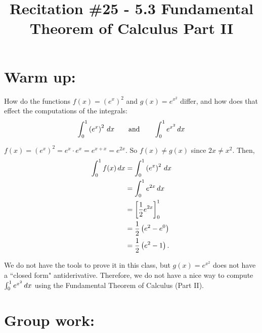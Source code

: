 \documentclass[handout,nooutcomes]{ximera}
\title{Recitation \#25 - 5.3 Fundamental Theorem of Calculus Part II}
\begin{document}
\begin{abstract}		\end{abstract}
\maketitle

\section*{Warm up:} 
How do the functions $f(x) = \left( e^x \right)^2$ and $g(x) = e^{x^2}$ differ, and how does that effect the computations of the integrals:
$$ \int_0^1 \left(e^x \right)^2 \,d x	\qquad	\text{and}	\qquad	\int_0^1 e^{x^2} \,d x $$
		\begin{freeResponse}
		$f(x) = \left( e^x \right)^2 = e^x \cdot e^x = e^{x+x} = e^{2x}$.  
		So $f(x) \neq g(x)$ since $2x \neq x^2$.  
		Then,
			\begin{align*}
			\int_0^1 f(x) \,d x &= \int_0^1 \left(e^x \right)^2 \,d x  \\
			&= \int_0^1 e^{2x} \,d x  \\
			&= \bigg[ \frac{1}{2} e^{2x} \bigg]_0^1  \\
			&= \frac{1}{2} \left( e^2 - e^0 \right)  \\
			&= \frac{1}{2} \left( e^2 - 1 \right).  
			\end{align*}
			
		We do not have the tools to prove it in this class, but $g(x) = e^{x^2}$ does not have a ``closed form" antiderivative.  
		Therefore, we do not have a nice way to compute $\int_0^1 e^{x^2} \,d x$ using the Fundamental Theorem of Calculus (Part II).
		\end{freeResponse}	
		
		
		

	
	
	
	
	

\section*{Group work:}
\end{document}
